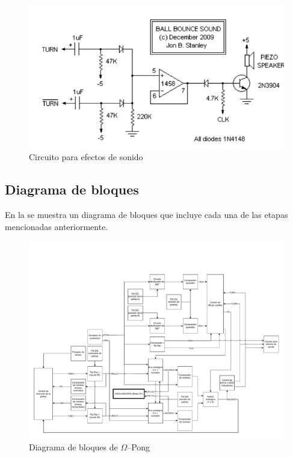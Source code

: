 \begin{figure}[H]
    \centering
    \includegraphics[width=0.5\linewidth]{figs/descripcion/sonido.png}
    \caption{Circuito para efectos de sonido \cite{pong}}
    \label{sonido}
\end{figure}

\subsection{Diagrama de bloques}
En la  se muestra un diagrama de bloques que incluye cada una de las etapas mencionadas anteriormente.

\begin{figure}[H]
    \centering
    \includegraphics[width=\linewidth]{figs/db/PongO.pdf}
    \caption{Diagrama de bloques de $\Omega$--Pong}
    \label{ohmpong}
\end{figure}